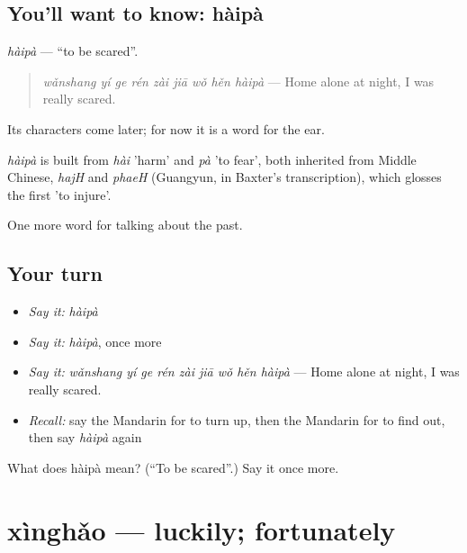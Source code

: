 \subsection*{You'll want to know: hàipà}
\emph{hàipà} — \textquotedblleft{}to be scared\textquotedblright{}.

\begin{quote}
\emph{wǎnshang yí ge rén zài jiā wǒ hěn hàipà} — Home alone at night, I was really scared.
\end{quote}

Its characters come later; for now it is a word for the ear.

\begin{cousinweb}
\emph{hàipà} is built from \emph{hài} 'harm' and \emph{pà} 'to fear', both inherited from Middle Chinese, \emph{hajH} and \emph{phaeH} (Guangyun, in Baxter's transcription), which glosses the first 'to injure'.
\end{cousinweb}

\begin{grammarlens}[title={What you've built}]
One more word for talking about the past.
\end{grammarlens}

\subsection*{Your turn}
\begin{itemize}
\raggedright
  \item \emph{Say it:} \emph{hàipà}
  \item \emph{Say it:} \emph{hàipà}, once more
  \item \emph{Say it:} \emph{wǎnshang yí ge rén zài jiā wǒ hěn hàipà} — Home alone at night, I was really scared.
  \item \emph{Recall:} say the Mandarin for to turn up, then the Mandarin for to find out, then say \emph{hàipà} again
\end{itemize}

\begin{tcolorbox}[breakable,colback=teal!4,colframe=teal!35!black,title={Before you move on}]
What does hàipà mean? (\textquotedblleft{}To be scared\textquotedblright{}.) Say it once more.
\end{tcolorbox}
\section[xìnghǎo]{xìnghǎo — luckily; fortunately}

